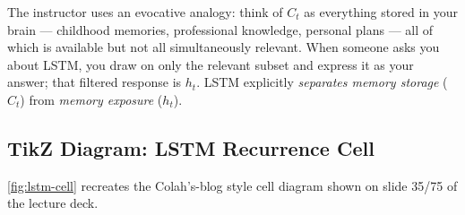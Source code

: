 \documentclass[12pt,a4paper]{article}
\begin{document}
\begin{keyinsight}[title=Memory Storage vs.\ Memory Exposure]
  The instructor uses an evocative analogy: think of $C_t$ as everything stored
  in your brain --- childhood memories, professional knowledge, personal plans
  --- all of which is available but not all simultaneously relevant.  When
  someone asks you about LSTM, you draw on only the relevant subset and
  express it as your answer; that filtered response is $h_t$.
  LSTM explicitly \emph{separates memory storage} ($C_t$) from
  \emph{memory exposure} ($h_t$).
\end{keyinsight}

\subsection{TikZ Diagram: LSTM Recurrence Cell}
\label{subsec:lstm-diagram}

\cref{fig:lstm-cell} recreates the Colah's-blog style cell diagram shown on
slide 35/75 of the lecture deck.
\end{document}
